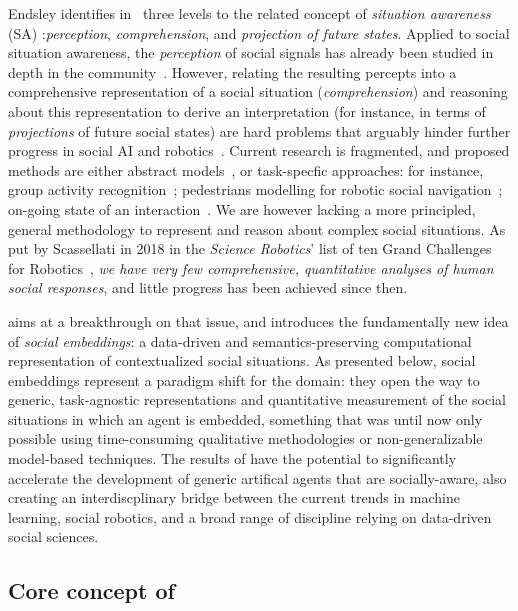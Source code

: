 
Endsley identifies in~\cite{endsley1995theory} three levels to the related concept
of \textit{situation awareness} (SA) :\emph{perception}, \emph{comprehension}, and
\emph{projection of future states}. Applied to social situation awareness,
the \emph{perception} of social signals has already been studied in depth in the
community~\cite{pantic2011social,vinciarelli2009social}.  However, relating the
resulting percepts into a comprehensive representation of a social situation
(\emph{comprehension}) and reasoning about this representation to derive an
interpretation (for instance, in terms of \emph{projections} of future social
states) are hard problems that arguably hinder further progress in social AI and
robotics~\cite{yang2018grand}. Current research is fragmented, and proposed
methods are either abstract models~\cite{gordon2016commonsense}, or task-specfic
approaches: for instance, group activity
recognition~\cite{shu2017cern,wu2019learning}; pedestrians modelling for robotic
social navigation~\cite{alahi2016social}; on-going state of an
interaction~\cite{garcía2020explainable}. We are however lacking a more
principled, general methodology to represent and reason about complex social
situations. As put by Scassellati in 2018 in the \emph{Science Robotics}' list of
ten Grand Challenges for Robotics~\cite{yang2018grand}, \emph{we have very few
comprehensive, quantitative analyses of human social responses}, and little
progress has been achieved since then.

\project aims at a breakthrough on that issue, and introduces the fundamentally new
idea of \emph{social embeddings}: a data-driven and semantics-preserving
computational representation of contextualized social situations.  As presented
below, social embeddings represent a paradigm shift for the domain: they open
the way to generic, task-agnostic representations and quantitative measurement
of the social situations in which an agent is embedded, something that was until
now only possible using time-consuming qualitative methodologies or
non-generalizable model-based techniques.  The results of \project have the
potential to significantly accelerate the development of generic artifical
agents that are socially-aware, also creating an interdiscplinary bridge between
the current trends in machine learning, social robotics, and a broad range of discipline relying
on data-driven social sciences.

\subsection{Core concept of \project}

